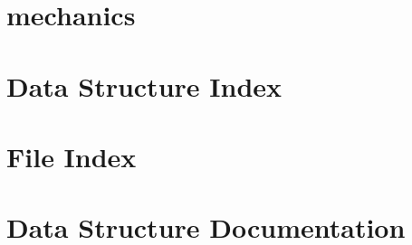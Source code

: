\let\mypdfximage\pdfximage\def\pdfximage{\immediate\mypdfximage}\documentclass[twoside]{book}
\newcommand{\+}{\discretionary{\mbox{\scriptsize$\hookleftarrow$}}{}{}}
\begin{document}
\chapter{mechanics}
\label{md_docs_NOTES}

\chapter{Data Structure Index}

\chapter{File Index}

\chapter{Data Structure Documentation}

\end{document}
